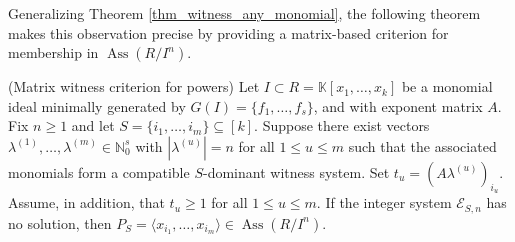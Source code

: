 \documentclass[11pt]{amsart}   %
\begin{document}
\medskip

Generalizing Theorem \ref{thm_witness_any_monomial}, the following theorem
makes this observation precise by providing a matrix-based criterion for
membership in $\operatorname{Ass}(R/I^n)$.








\begin{thm}{\rm (Matrix witness criterion for powers)}  \label{thm:matrix_power_witness}
Let $I \subset R=\mathbb K[x_1,\ldots,x_k]$ be a monomial ideal minimally generated by $G(I)=\{f_1,\ldots,f_s\}$, and with exponent matrix $A$. Fix $n\geq1$ and let
$S=\{i_1,\ldots,i_m\}\subseteq[k].$  Suppose there exist vectors
 $\lambda^{(1)},\ldots,\lambda^{(m)} \in\mathbb N_0^s$ with $|\lambda^{(u)}|=n$ for all $1\leq u \leq m$
 such that the associated monomials form a compatible $S$-dominant witness system. Set
 $t_u=(A\lambda^{(u)})_{i_u}.$ Assume, in addition, that $t_u\geq 1$ for all $1\leq u \leq m$.
 If the integer system $\mathcal E_{S,n}$ has no solution, then
 $P_S=\langle x_{i_1},\ldots,x_{i_m}\rangle \in \operatorname{Ass}(R/I^n).$
\end{thm}
\end{document}
